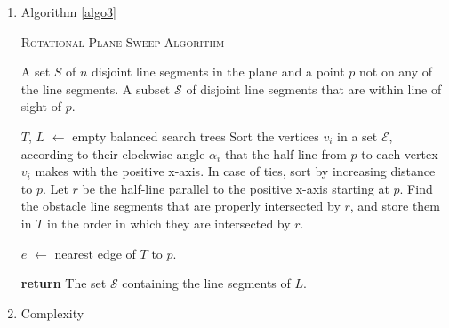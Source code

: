 \documentclass[11pt]{article}
\begin{document}
\begin{enumerate}[1.]
    \item Algorithm \ref{algo3} \cite{trakla}

    \begin{algorithm}[ht!]
    \caption{\textsc{Rotational Plane Sweep Algorithm}}
    \label{algo3}
    \begin{algorithmic}[1]

    \Require A set $S$ of $n$ disjoint line segments in the plane and a point $p$ not on any of the line segments. 
    \Ensure A subset $\mathcal{S}$ of disjoint line segments that are within line of sight of $p$.
    
        \State $T$, $L$ $\gets$ empty balanced search trees
        \State Sort the vertices  $v_i$ in a set $\mathcal{E}$, according to their clockwise angle $\alpha_i$ that the half-line from $p$ to each vertex $v_i$ makes with the positive x-axis.  In case of ties, sort by increasing distance to $p$.
        \State Let $r$ be the half-line parallel to the positive x-axis starting at $p$. Find the obstacle line segments  that are properly intersected by $r$, and store them in $T$ in the order in which they are intersected by $r$.
         

            
            \State $e$ $\gets$ nearest edge of $T$  to $p$.
            
            \EndIf
            
        \EndFor
        
        \State \textbf{return} The set $\mathcal{S}$ containing the line segments of $L$.
 
    
    \end{algorithmic}
    \end{algorithm}
    
    \item Complexity \cite{ex3}
    

\end{enumerate}
\end{document}
